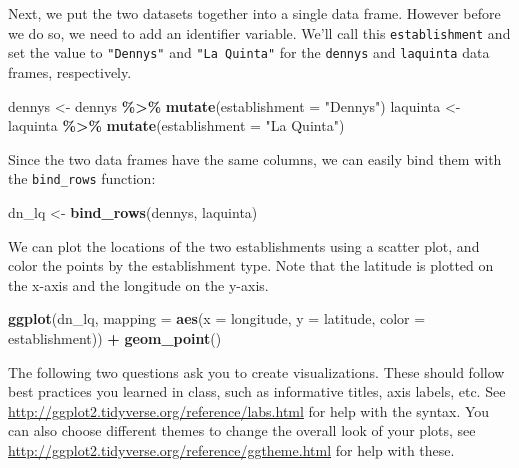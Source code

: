 \documentclass[
]{article}
\newenvironment{Shaded}{\begin{snugshade}}{\end{snugshade}}
\newcommand{\AttributeTok}[1]{\textcolor[rgb]{0.13,0.29,0.53}{#1}}
\newcommand{\FunctionTok}[1]{\textcolor[rgb]{0.13,0.29,0.53}{\textbf{#1}}}
\newcommand{\NormalTok}[1]{#1}
\newcommand{\OtherTok}[1]{\textcolor[rgb]{0.56,0.35,0.01}{#1}}
\newcommand{\SpecialCharTok}[1]{\textcolor[rgb]{0.81,0.36,0.00}{\textbf{#1}}}
\newcommand{\StringTok}[1]{\textcolor[rgb]{0.31,0.60,0.02}{#1}}
\begin{document}
Next, we put the two datasets together into a single data frame. However
before we do so, we need to add an identifier variable. We'll call this
\texttt{establishment} and set the value to
\texttt{"Denny\textquotesingle{}s"} and \texttt{"La\ Quinta"} for the
\texttt{dennys} and \texttt{laquinta} data frames, respectively.

\begin{Shaded}
\begin{Highlighting}[]
\NormalTok{dennys }\OtherTok{\textless{}{-}}\NormalTok{ dennys }\SpecialCharTok{\%\textgreater{}\%}
  \FunctionTok{mutate}\NormalTok{(}\AttributeTok{establishment =} \StringTok{"Denny\textquotesingle{}s"}\NormalTok{)}
\NormalTok{laquinta }\OtherTok{\textless{}{-}}\NormalTok{ laquinta }\SpecialCharTok{\%\textgreater{}\%}
  \FunctionTok{mutate}\NormalTok{(}\AttributeTok{establishment =} \StringTok{"La Quinta"}\NormalTok{)}
\end{Highlighting}
\end{Shaded}

Since the two data frames have the same columns, we can easily bind them
with the \texttt{bind\_rows} function:

\begin{Shaded}
\begin{Highlighting}[]
\NormalTok{dn\_lq }\OtherTok{\textless{}{-}} \FunctionTok{bind\_rows}\NormalTok{(dennys, laquinta)}
\end{Highlighting}
\end{Shaded}

We can plot the locations of the two establishments using a scatter
plot, and color the points by the establishment type. Note that the
latitude is plotted on the x-axis and the longitude on the y-axis.

\begin{Shaded}
\begin{Highlighting}[]
\FunctionTok{ggplot}\NormalTok{(dn\_lq, }\AttributeTok{mapping =} \FunctionTok{aes}\NormalTok{(}\AttributeTok{x =}\NormalTok{ longitude, }\AttributeTok{y =}\NormalTok{ latitude, }\AttributeTok{color =}\NormalTok{ establishment)) }\SpecialCharTok{+}
  \FunctionTok{geom\_point}\NormalTok{()}
\end{Highlighting}
\end{Shaded}

The following two questions ask you to create visualizations. These
should follow best practices you learned in class, such as informative
titles, axis labels, etc. See
\url{http://ggplot2.tidyverse.org/reference/labs.html} for help with the
syntax. You can also choose different themes to change the overall look
of your plots, see
\url{http://ggplot2.tidyverse.org/reference/ggtheme.html} for help with
these.
\end{document}
